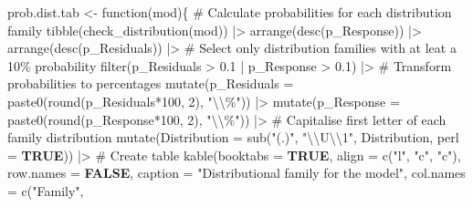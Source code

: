 \documentclass[
  bookmarksnumbered]{article}
\newenvironment{Shaded}{\begin{snugshade}}{\end{snugshade}}
\newcommand{\AttributeTok}[1]{\textcolor[rgb]{0.80,0.80,0.80}{#1}}
\newcommand{\CommentTok}[1]{\textcolor[rgb]{0.50,0.62,0.50}{#1}}
\newcommand{\ConstantTok}[1]{\textcolor[rgb]{0.86,0.64,0.64}{\textbf{#1}}}
\newcommand{\ControlFlowTok}[1]{\textcolor[rgb]{0.94,0.87,0.69}{#1}}
\newcommand{\DecValTok}[1]{\textcolor[rgb]{0.86,0.86,0.80}{#1}}
\newcommand{\FloatTok}[1]{\textcolor[rgb]{0.75,0.75,0.82}{#1}}
\newcommand{\FunctionTok}[1]{\textcolor[rgb]{0.94,0.94,0.56}{#1}}
\newcommand{\NormalTok}[1]{\textcolor[rgb]{0.80,0.80,0.80}{#1}}
\newcommand{\OtherTok}[1]{\textcolor[rgb]{0.94,0.94,0.56}{#1}}
\newcommand{\SpecialCharTok}[1]{\textcolor[rgb]{0.86,0.64,0.64}{#1}}
\newcommand{\StringTok}[1]{\textcolor[rgb]{0.80,0.58,0.58}{#1}}
\begin{document}
\begin{Shaded}
\begin{Highlighting}[]
\NormalTok{prob.dist.tab }\OtherTok{\textless{}{-}} \ControlFlowTok{function}\NormalTok{(mod)\{}
  \CommentTok{\# Calculate probabilities for each distribution family}
  \FunctionTok{tibble}\NormalTok{(}\FunctionTok{check\_distribution}\NormalTok{(mod)) }\SpecialCharTok{|\textgreater{}}
    \FunctionTok{arrange}\NormalTok{(}\FunctionTok{desc}\NormalTok{(p\_Response)) }\SpecialCharTok{|\textgreater{}} 
    \FunctionTok{arrange}\NormalTok{(}\FunctionTok{desc}\NormalTok{(p\_Residuals)) }\SpecialCharTok{|\textgreater{}} 
  \CommentTok{\# Select only distribution families with at leat a 10\% probability}
  \FunctionTok{filter}\NormalTok{(p\_Residuals }\SpecialCharTok{\textgreater{}} \FloatTok{0.1} \SpecialCharTok{|}\NormalTok{ p\_Response }\SpecialCharTok{\textgreater{}} \FloatTok{0.1}\NormalTok{) }\SpecialCharTok{|\textgreater{}} 
  \CommentTok{\# Transform probabilities to percentages}
  \FunctionTok{mutate}\NormalTok{(}\AttributeTok{p\_Residuals =} \FunctionTok{paste0}\NormalTok{(}\FunctionTok{round}\NormalTok{(p\_Residuals}\SpecialCharTok{*}\DecValTok{100}\NormalTok{, }\DecValTok{2}\NormalTok{), }\StringTok{"}\SpecialCharTok{\textbackslash{}\textbackslash{}}\StringTok{\%"}\NormalTok{)) }\SpecialCharTok{|\textgreater{}} 
  \FunctionTok{mutate}\NormalTok{(}\AttributeTok{p\_Response =} \FunctionTok{paste0}\NormalTok{(}\FunctionTok{round}\NormalTok{(p\_Response}\SpecialCharTok{*}\DecValTok{100}\NormalTok{, }\DecValTok{2}\NormalTok{), }\StringTok{"}\SpecialCharTok{\textbackslash{}\textbackslash{}}\StringTok{\%"}\NormalTok{)) }\SpecialCharTok{|\textgreater{}} 
  \CommentTok{\# Capitalise first letter of each family distribution}
  \FunctionTok{mutate}\NormalTok{(}\AttributeTok{Distribution =} \FunctionTok{sub}\NormalTok{(}\StringTok{"(.)"}\NormalTok{, }\StringTok{"}\SpecialCharTok{\textbackslash{}\textbackslash{}}\StringTok{U}\SpecialCharTok{\textbackslash{}\textbackslash{}}\StringTok{1"}\NormalTok{, Distribution, }\AttributeTok{perl =} \ConstantTok{TRUE}\NormalTok{)) }\SpecialCharTok{|\textgreater{}} 
  \CommentTok{\# Create table}
  \FunctionTok{kable}\NormalTok{(}\AttributeTok{booktabs =} \ConstantTok{TRUE}\NormalTok{, }
        \AttributeTok{align =} \FunctionTok{c}\NormalTok{(}\StringTok{"l"}\NormalTok{, }\StringTok{"c"}\NormalTok{, }\StringTok{"c"}\NormalTok{),}
        \AttributeTok{row.names =} \ConstantTok{FALSE}\NormalTok{,}
        \AttributeTok{caption =} \StringTok{"Distributional family for the model"}\NormalTok{,}
        \AttributeTok{col.names =} \FunctionTok{c}\NormalTok{(}\StringTok{"Family"}\NormalTok{,}

\end{Highlighting}
\end{Shaded}
\end{document}
